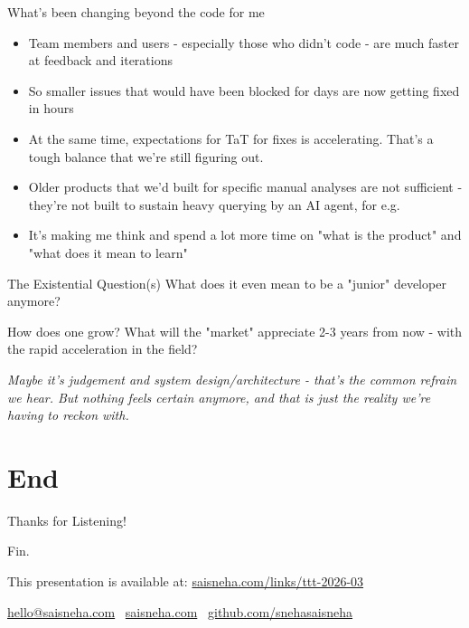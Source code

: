 \documentclass{beamer}
\begin{document}
\begin{frame}{What's been changing beyond the code for me}
    \begin{itemize}[<+->]
        \item Team members and users - especially those who didn't code - are much faster at feedback and iterations
        \item So smaller issues that would have been blocked for days are now getting fixed in hours
        \item At the same time, expectations for TaT for fixes is accelerating. That's a tough balance that we're still figuring out.
        \item Older products that we'd built for specific manual analyses are not sufficient - they're not built to sustain heavy querying by an AI agent, for e.g.
        \item It's making me think and spend a lot more time on "what is the product" and "what does it mean to learn"
    \end{itemize}
\end{frame}

\begin{frame}{The Existential Question(s)}
    \Large
    What does it even mean to be a "junior" developer anymore?

    \vspace{1em}
    \normalsize
    How does one grow? What will the "market" appreciate 2-3 years from now - with the rapid acceleration in the field?

    \vspace{1em}
    \textit{Maybe it's judgement and system design/architecture - that's the common refrain we hear. But nothing feels certain anymore, and that is just the reality we're having to reckon with.}

\end{frame}

\section{End}

\begin{frame}{Thanks for Listening!}
    \begin{center}
        \Large
        Fin.

        \vspace{1em}

        \normalsize

        This presentation is available at: \url{saisneha.com/links/ttt-2026-03}
    

    \vspace{2em}
    \scriptsize
    \url{hello@saisneha.com} \textbar\ \url{saisneha.com} \textbar\ \url{github.com/snehasaisneha}

    \end{center}
\end{frame}
\end{document}
